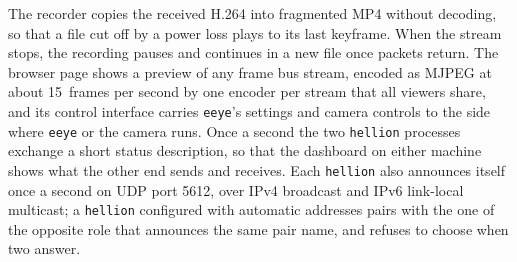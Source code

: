 \documentclass[a4paper,fleqn]{cas-sc}
\newcommand{\eeye}{\texttt{eeye}}
\newcommand{\hellion}{\texttt{hellion}}
\begin{document}
The recorder copies the received H.264 into fragmented MP4 without decoding, so that a
file cut off by a power loss plays to its last keyframe. When the stream stops, the
recording pauses and continues in a new file once packets return. The browser page
shows a preview of any frame bus stream, encoded as MJPEG at about 15~frames per
second by one encoder per stream that all viewers share, and its control interface
carries \eeye{}'s settings and camera controls to the side where \eeye{} or the
camera runs. Once a second the two \hellion{} processes exchange a short status
description, so that the dashboard on either machine shows what the other end sends
and receives. Each \hellion{} also announces itself once a second on UDP port 5612,
over IPv4 broadcast and IPv6 link-local multicast; a \hellion{} configured with
automatic addresses pairs with the one of the opposite role that announces the same
pair name, and refuses to choose when two answer.
\end{document}
